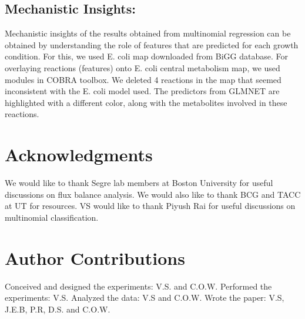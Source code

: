 \documentclass[12pt]{article}
\begin{document}
\subsection*{Mechanistic Insights:} 
Mechanistic insights of the results obtained from multinomial regression can be obtained by understanding the role of features that are predicted for each growth condition. For this, we used E. coli map downloaded from BiGG database. For overlaying reactions (features) onto E. coli central metabolism map, we used modules in COBRA toolbox. We deleted 4 reactions in the map that seemed inconsistent with the E. coli model used. The predictors from GLMNET are highlighted with a different color, along with the metabolites involved in these reactions.


\section*{Acknowledgments}
We would like to thank Segre lab members at Boston University for useful discussions on flux balance analysis. We would also like to thank BCG and TACC at UT for resources. VS would like to thank Piyush Rai for useful discussions on multinomial classification.

\section*{Author Contributions}
Conceived and designed the experiments: V.S. and C.O.W. Performed the experiments: V.S. Analyzed the data: V.S and C.O.W. Wrote the paper: V.S,  J.E.B, P.R, D.S. and C.O.W.


\end{document}
